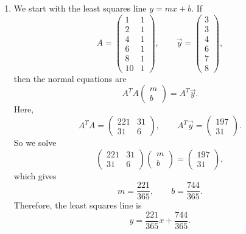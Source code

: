\documentclass[10pt]{extarticle}
\begin{document}
\begin{enumerate}[label=(\alph*)]
\item We start with the least squares line $y=mx+b$. If
\[
A=
\begin{pmatrix}
1 & 1\\
2 & 1\\
4 & 1\\
6 & 1\\
8 & 1\\
10 & 1
\end{pmatrix},
\qquad
\vec{y}=
\begin{pmatrix}
3\\3\\4\\6\\7\\8
\end{pmatrix},
\]
then the normal equations are
\[
A^TA
\begin{pmatrix}
m\\b
\end{pmatrix}
=
A^T\vec{y}.
\]
Here,
\[
A^TA=
\begin{pmatrix}
221 & 31\\
31 & 6
\end{pmatrix},
\qquad
A^T\vec{y}=
\begin{pmatrix}
197\\
31
\end{pmatrix}.
\]
So we solve
\[
\begin{pmatrix}
221 & 31\\
31 & 6
\end{pmatrix}
\begin{pmatrix}
m\\b
\end{pmatrix}
=
\begin{pmatrix}
197\\
31
\end{pmatrix},
\]
which gives
\[
m=\frac{221}{365},
\qquad
b=\frac{744}{365}.
\]
Therefore, the least squares line is
\[
y=\frac{221}{365}x+\frac{744}{365}.
\]


\end{enumerate}
\end{document}

